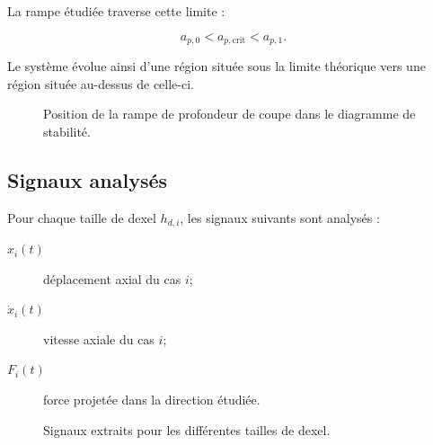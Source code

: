\documentclass[
    11pt,
    a4paper
]{article}
\begin{document}
La rampe étudiée traverse cette limite :

\begin{equation}
    a_{p,0}
    <
    a_{p,\mathrm{crit}}
    <
    a_{p,1}.
    \label{eq:traversee-limite}
\end{equation}

Le système évolue ainsi d'une région située sous la limite théorique vers une
région située au-dessus de celle-ci.


\begin{figure}[H]
    \centering
    \caption{Position de la rampe de profondeur de coupe dans le diagramme de stabilité.}
    \label{fig:lobes_stabilite}
\end{figure}

\subsection{Signaux analysés}
\label{subsec:signaux}

Pour chaque taille de dexel \(h_{d,i}\), les signaux suivants sont analysés :

\begin{description}
    \item[\(x_i(t)\)] déplacement axial du cas \(i\);
    \item[\(\dot{x}_i(t)\)] vitesse axiale du cas \(i\);
    \item[\(F_i(t)\)] force projetée dans la direction étudiée.
\end{description}


\begin{figure}[H]
    \centering
    \caption{Signaux extraits pour les différentes tailles de dexel.}
    \label{fig:signaux_complets}
\end{figure}
\end{document}
